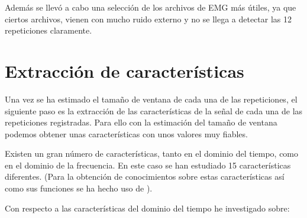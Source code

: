 Además se llevó a cabo una selección de los archivos de EMG más útiles, ya que ciertos archivos, vienen con mucho ruido externo y no se llega a detectar las 12 repeticiones claramente.
\section{Extracción de características}
 Una vez se ha estimado el tamaño de ventana de cada una de las repeticiones, el siguiente paso es la extracción de las características de la señal de cada una de las repeticiones registradas. Para ello con la estimación del tamaño de ventana podemos obtener unas características con unos valores muy fiables. 

 Existen un gran número de características, tanto en el dominio del tiempo, como en el dominio de la frecuencia. En este caso se han estudiado 15 características diferentes. (Para la obtención de conocimientos sobre estas características así como sus funciones se ha hecho uso de \cite{romo2007analisis,phinyomark2012feature}).

Con respecto a las características del dominio del tiempo he investigado sobre:

